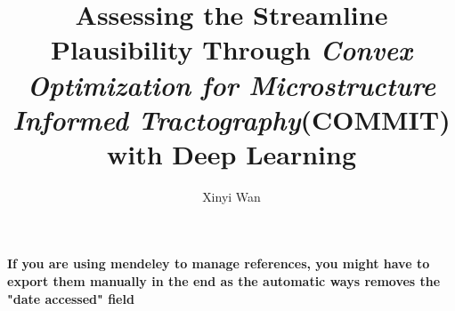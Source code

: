 \documentclass[12pt, openany]{book}
\title{Assessing the Streamline Plausibility Through \textit{Convex Optimization for Microstructure Informed Tractography}(COMMIT) with Deep Learning}
\author{Xinyi Wan}
\begin{document}








% 



% 

\newpage
{}
\textbf{If you are using mendeley to manage references, you might have to export them manually in the end as the automatic ways removes the "date accessed" field}
\printbibliography





\end{document}
